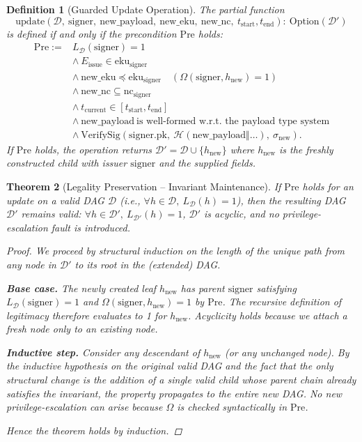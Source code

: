 \documentclass[11pt,a4paper]{article}
\newtheorem{theorem}{Theorem}[section]
\newtheorem{definition}[theorem]{Definition}
\begin{document}
\begin{definition}[Guarded Update Operation]
The partial function
\[
\text{update}(\mathcal{D},\ \text{signer},\ \text{new\_payload},\ \text{new\_eku},\ \text{new\_nc},\ t_{\text{start}}, t_{\text{end}}) :\ \text{Option}(\mathcal{D}')
\]
is defined if and only if the precondition \(\text{Pre}\) holds:
\begin{align*}
\text{Pre} \;:=\; &
L_{\mathcal{D}}(\text{signer}) = 1 \\
&\land\ E_{\text{issue}} \in \text{eku}_{\text{signer}} \\
&\land\ \text{new\_eku} \preceq \text{eku}_{\text{signer}}\quad(\Omega(\text{signer}, h_{\text{new}}) = 1) \\
&\land\ \text{new\_nc} \subseteq \text{nc}_{\text{signer}} \\
&\land\ t_{\text{current}} \in [t_{\text{start}}, t_{\text{end}}] \\
&\land\ \text{new\_payload}\ \text{is well-formed w.r.t.\ the payload type system} \\
&\land\ \text{VerifySig}(\text{signer}.\text{pk},\ \mathcal{H}(\text{new\_payload} \Vert \dots),\ \sigma_{\text{new}}).
\end{align*}
If \(\text{Pre}\) holds, the operation returns \(\mathcal{D}' = \mathcal{D} \cup \{h_{\text{new}}\}\) where \(h_{\text{new}}\) is the freshly constructed child with issuer \(\text{signer}\) and the supplied fields.
\end{definition}

\begin{theorem}[Legality Preservation -- Invariant Maintenance]
If \(\text{Pre}\) holds for an update on a valid DAG \(\mathcal{D}\) (i.e., \(\forall h \in \mathcal{D},\ L_{\mathcal{D}}(h) = 1\)), then the resulting DAG \(\mathcal{D}'\) remains valid: \(\forall h \in \mathcal{D}',\ L_{\mathcal{D}'}(h) = 1\), \(\mathcal{D}'\) is acyclic, and no privilege-escalation fault is introduced.

\begin{proof}
We proceed by structural induction on the length of the unique path from any node in \(\mathcal{D}'\) to its root in the (extended) DAG.  

\textbf{Base case.} The newly created leaf \(h_{\text{new}}\) has parent \(\text{signer}\) satisfying \(L_{\mathcal{D}}(\text{signer}) = 1\) and \(\Omega(\text{signer}, h_{\text{new}}) = 1\) by \(\text{Pre}\). The recursive definition of legitimacy therefore evaluates to 1 for \(h_{\text{new}}\). Acyclicity holds because we attach a fresh node only to an existing node.  

\textbf{Inductive step.} Consider any descendant of \(h_{\text{new}}\) (or any unchanged node). By the inductive hypothesis on the original valid DAG and the fact that the only structural change is the addition of a single valid child whose parent chain already satisfies the invariant, the property propagates to the entire new DAG. No new privilege-escalation can arise because \(\Omega\) is checked syntactically in \(\text{Pre}\).  

Hence the theorem holds by induction.
\end{proof}
\end{theorem}
\end{document}
